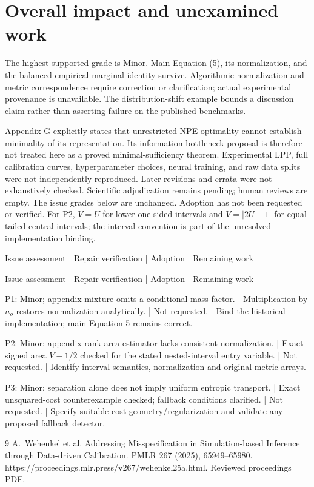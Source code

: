 \documentclass[10pt]{article}
\begin{document}
\section*{Overall impact and unexamined work}
The highest supported grade is Minor. Main Equation (5), its normalization, and the balanced empirical marginal identity survive. Algorithmic normalization and metric correspondence require correction or clarification; actual experimental provenance is unavailable. The distribution-shift example bounds a discussion claim rather than asserting failure on the published benchmarks.\par
Appendix G explicitly states that unrestricted NPE optimality cannot establish minimality of its representation. Its information-bottleneck proposal is therefore not treated here as a proved minimal-sufficiency theorem. Experimental LPP, full calibration curves, hyperparameter choices, neural training, and raw data splits were not independently reproduced. Later revisions and errata were not exhaustively checked. Scientific adjudication remains pending; human reviews are empty. The issue grades below are unchanged. Adoption has not been requested or verified. For P2, \(V=U\) for lower one-sided intervals and \(V=|2U-1|\) for equal-tailed central intervals; the interval convention is part of the unresolved implementation binding.\par
Issue assessment | Repair verification | Adoption | Remaining work\par
Issue assessment | Repair verification | Adoption | Remaining work\par
P1: Minor; appendix mixture omits a conditional-mass factor. | Multiplication by \(n_o\) restores normalization analytically. | Not requested. | Bind the historical implementation; main Equation 5 remains correct.\par
P2: Minor; appendix rank-area estimator lacks consistent normalization. | Exact signed area \(\overline V-1/2\) checked for the stated nested-interval entry variable. | Not requested. | Identify interval semantics, normalization and original metric arrays.\par
P3: Minor; separation alone does not imply uniform entropic transport. | Exact unsquared-cost counterexample checked; fallback conditions clarified. | Not requested. | Specify suitable cost geometry/regularization and validate any proposed fallback detector.\par
9 A. Wehenkel et al. Addressing Misspecification in Simulation-based Inference through Data-driven Calibration. PMLR 267 (2025), 65949–65980. https://proceedings.mlr.press/v267/wehenkel25a.html. Reviewed proceedings PDF.\par
\end{document}
